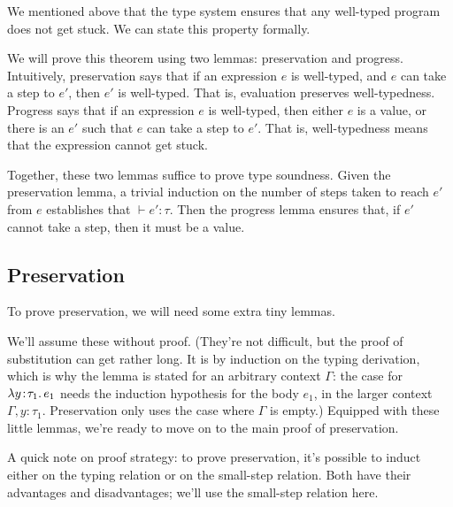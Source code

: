 We mentioned above that the type system ensures that any well-typed program does not get stuck. We can state this property formally.


We will prove this theorem using two lemmas: preservation and progress. Intuitively, preservation says that if an expression $e$ is well-typed, and $e$ can take a step to $e'$, then $e'$ is well-typed. That is, evaluation preserves well-typedness. Progress says that if an expression $e$ is well-typed, then either $e$ is a value, or there is an $e'$ such that $e$ can take a step to $e'$. That is, well-typedness means that the expression cannot get stuck.

Together, these two lemmas suffice to prove type soundness. Given the preservation lemma, a trivial induction on the number of steps taken to reach $e'$ from $e$ establishes that $\vdash e' : \tau$. Then the progress lemma ensures that, if $e'$ cannot take a step, then it must be a value.

\subsection{Preservation}

To prove preservation, we will need some extra tiny lemmas.



We'll assume these without proof. (They're not difficult, but the proof of substitution can get rather long. It is by induction on the typing derivation, which is why the lemma is stated for an arbitrary context $\Gamma$: the case for $\lambda y\!:\!\tau_1.\, e_1$ needs the induction hypothesis for the body $e_1$, in the larger context $\Gamma, y:\tau_1$. Preservation only uses the case where $\Gamma$ is empty.) Equipped with these little lemmas, we're ready to move on to the main proof of preservation.

A quick note on proof strategy: to prove preservation, it's possible to induct either on the typing relation or on the small-step relation. Both have their advantages and disadvantages; we'll use the small-step relation here.

